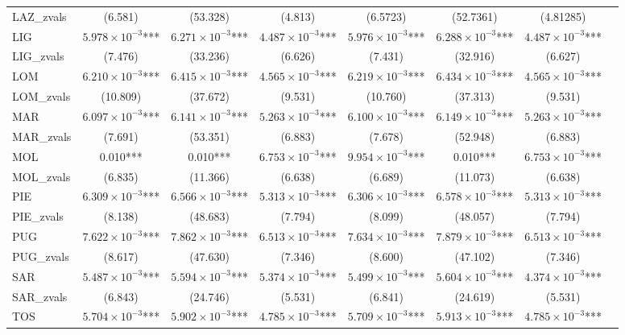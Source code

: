\documentclass[12pt]{article}
\begin{document}
\begin{appendices}
\begin{landscape}
\begin{longtable}{@{}lccccccc@{}}
            LAZ\_zvals & (6.581) & (53.328) & (4.813) & (6.5723) & (52.7361) & (4.81285) \\ 
            LIG & $5.978 \times 10^{-3}$*** & $6.271 \times 10^{-3}$*** & $4.487 \times 10^{-3}$*** & $5.976 \times 10^{-3}$*** & $6.288 \times 10^{-3}$*** & $4.487 \times 10^{-3}$*** \\ 
            LIG\_zvals & (7.476) & (33.236) & (6.626) & (7.431) & (32.916) & (6.627) \\ 
            LOM & $6.210 \times 10^{-3}$*** & $6.415 \times 10^{-3}$*** & $4.565 \times 10^{-3}$*** & $6.219 \times 10^{-3}$*** & $6.434 \times 10^{-3}$*** & $4.565 \times 10^{-3}$*** \\ 
            LOM\_zvals & (10.809) & (37.672) & (9.531) & (10.760) & (37.313) & (9.531) \\ 
            MAR & $6.097 \times 10^{-3}$*** & $6.141 \times 10^{-3}$*** & $5.263 \times 10^{-3}$*** & $6.100 \times 10^{-3}$*** & $6.149 \times 10^{-3}$*** & $5.263 \times 10^{-3}$*** \\ 
            MAR\_zvals & (7.691) & (53.351) & (6.883) & (7.678) & (52.948) & (6.883) \\ 
            MOL & 0.010*** & 0.010*** & $6.753 \times 10^{-3}$*** & $9.954 \times 10^{-3}$*** & 0.010*** & $6.753 \times 10^{-3}$*** \\
            MOL\_zvals & (6.835) & (11.366) & (6.638) & (6.689) & (11.073) & (6.638) \\ 
            PIE & $6.309 \times 10^{-3}$*** & $6.566 \times 10^{-3}$*** & $5.313 \times 10^{-3}$*** & $6.306 \times 10^{-3}$*** & $6.578 \times 10^{-3}$*** & $5.313 \times 10^{-3}$*** \\ 
            PIE\_zvals & (8.138) & (48.683) & (7.794) & (8.099) & (48.057) & (7.794) \\ 
            PUG & $7.622 \times 10^{-3}$*** & $7.862 \times 10^{-3}$*** & $6.513 \times 10^{-3}$*** & $7.634 \times 10^{-3}$*** & $7.879 \times 10^{-3}$*** & $6.513 \times 10^{-3}$*** \\ 
            PUG\_zvals & (8.617) & (47.630) & (7.346) & (8.600) & (47.102) & (7.346) \\ 
            SAR & $5.487 \times 10^{-3}$*** & $5.594 \times 10^{-3}$*** & $5.374 \times 10^{-3}$*** & $5.499 \times 10^{-3}$*** & $5.604 \times 10^{-3}$*** & $4.374 \times 10^{-3}$*** \\ 
            SAR\_zvals & (6.843) & (24.746) & (5.531) & (6.841) & (24.619) & (5.531) \\ 
            TOS & $5.704 \times 10^{-3}$*** & $5.902 \times 10^{-3}$*** & $4.785 \times 10^{-3}$*** & $5.709 \times 10^{-3}$*** & $5.913 \times 10^{-3}$*** & $4.785 \times 10^{-3}$*** \\ 

\end{longtable}
\end{landscape}
\end{appendices}
\end{document}
